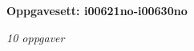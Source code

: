 \centerline{\bf Oppgavesett: i00621no-i00630no}
\vskip 10pt
\centerline{\it 10 oppgaver}\vskip 10pt
\vskip 10pt
